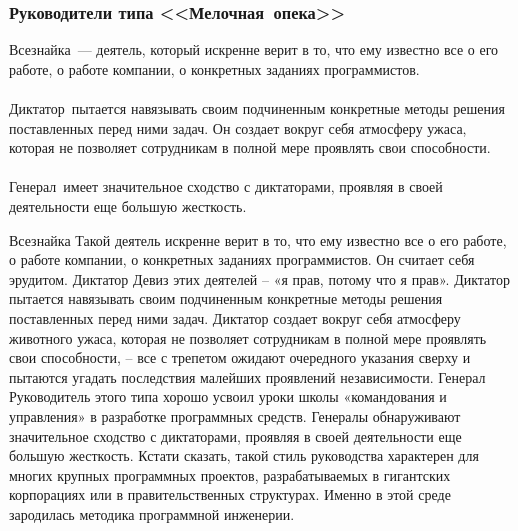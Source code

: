 \documentclass{../industrial-development}
\begin{document}
\begin{frame} \frametitle{Руководители типа <<Мелочная~опека>>}
	\alert{Всезнайка}~— деятель, который искренне верит в то, что ему известно все о его работе, о работе компании, о конкретных заданиях программистов.\\~\\
\alert{Диктатор}~пытается навязывать своим подчиненным конкретные методы решения поставленных перед ними задач. Он создает вокруг себя атмосферу ужаса, которая не позволяет сотрудникам в полной мере проявлять свои способности.\\~\\
\alert{Генерал}~имеет значительное сходство с диктаторами, проявляя в своей деятельности еще большую жесткость.
\\
\end{frame}
\lecturenotes
Всезнайка 
Такой деятель искренне верит в то, что ему известно все о его работе, о работе компании, о конкретных заданиях программистов. Он считает себя эрудитом. 
Диктатор 
Девиз этих деятелей – «я прав, потому что я прав». Диктатор пытается навязывать своим подчиненным конкретные методы решения поставленных перед ними задач. Диктатор создает вокруг себя атмосферу животного ужаса, которая не позволяет сотрудникам в полной мере проявлять свои способности, – все с трепетом ожидают очередного указания сверху и пытаются угадать последствия малейших проявлений независимости. 
Генерал
Руководитель этого типа хорошо усвоил уроки школы «командования и управления» в разработке программных средств. Генералы обнаруживают значительное сходство с диктаторами, проявляя в своей деятельности еще большую жесткость.
Кстати сказать, такой стиль руководства характерен для многих крупных программных проектов, разрабатываемых в гигантских корпорациях или в правительственных структурах. Именно в этой среде зародилась методика программной инженерии. 
\end{document}
